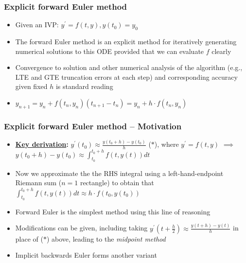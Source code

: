\documentclass[usenames,svgnames,dvipsnames,10pt]{beamer}
\begin{document}
\begin{frame}
\frametitle{Explicit forward Euler method}

\begin{itemize} 

\item Given an IVP: $y^{\prime} = f(t, y), y(t_0) = y_0$ 
\item The forward Euler method is an explicit method for iteratively 
      generating numerical solutions to this ODE provided that we can 
      evaluate $f$ clearly 
\item Convergence to solution and other numerical analysis of the algorithm 
      (e.g., LTE and GTE truncation errors at each step) and 
      corresponding accuracy given fixed $h$ is standard reading 
\item $y_{n+1} = y_n + f(t_n, y_n) \left(t_{n+1} - t_n\right) = y_n + h \cdot f(t_n, y_n)$ 

\end{itemize} 

\end{frame}

\begin{frame}
\frametitle{Explicit forward Euler method -- Motivation}

\begin{itemize} 

\item \textbf{\underline{Key derivation}:} $y^{\prime}(t_0) \approx \frac{y(t_0+h)-y(t_0)}{h}$ ($\ast$), where 
      $y^{\prime} = f(t, y)$ $\implies$ $y(t_0+h)-y(t_0) \approx \int_{t_0}^{t_0+h} f(t, y(t)) dt$ 
\item Now we approximate the the RHS integral using a left-hand-endpoint Riemann sum ($n=1$ rectangle) to 
      obtain that $\int_{t_0}^{t_0+h} f(t, y(t)) dt \approx h \cdot f(t_0, y(t_0))$
\item Forward Euler is the simplest method using this line of reasoning 
\item Modifications can be given, including 
      taking $y^{\prime}\left(t + \frac{h}{2}\right) \approx \frac{y(t+h)-y(t)}{h}$ in place of ($\ast$) above, 
      leading to the \emph{midpoint method} 
\item Implicit backwards Euler forms another variant 

\end{itemize} 

\end{frame}
\end{document}
